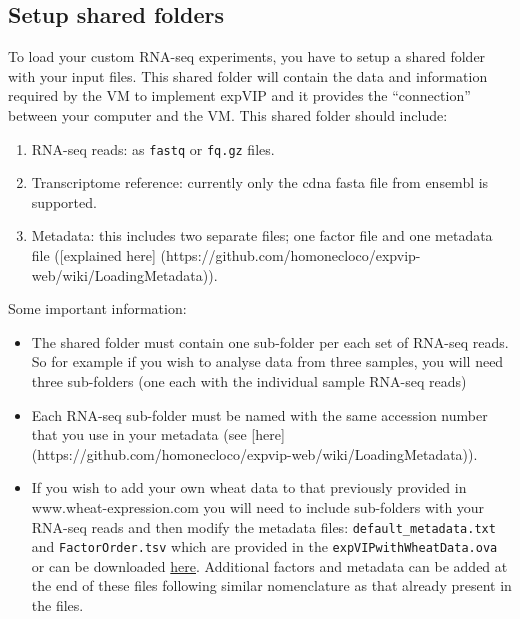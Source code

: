 \subsection{Setup shared folders}\label{setup-shared-folders}

To load your custom RNA-seq experiments, you have to setup a shared
folder with your input files. This shared folder will contain the data
and information required by the VM to implement expVIP and it provides
the ``connection'' between your computer and the VM. This shared folder
should include:

\begin{enumerate}
\def\labelenumi{\arabic{enumi}.}
\itemsep1pt\parskip0pt
\item
  RNA-seq reads: as \lstinline!fastq! or \lstinline!fq.gz! files.
\item
  Transcriptome reference: currently only the cdna fasta file from
  ensembl is supported.
\item
  Metadata: this includes two separate files; one factor file and one
  metadata file ({[}explained here{]}
  (https://github.com/homonecloco/expvip-web/wiki/LoadingMetadata)).
\end{enumerate}

Some important information:

\begin{itemize}
\itemsep1pt\parskip0pt
\item
  The shared folder must contain one sub-folder per each set of RNA-seq
  reads. So for example if you wish to analyse data from three samples,
  you will need three sub-folders (one each with the individual sample
  RNA-seq reads)
\item
  Each RNA-seq sub-folder must be named with the same accession number
  that you use in your metadata (see {[}here{]}
  (https://github.com/homonecloco/expvip-web/wiki/LoadingMetadata)).
\item
  If you wish to add your own wheat data to that previously provided in
  www.wheat-expression.com you will need to include sub-folders with
  your RNA-seq reads and then modify the metadata files:
  \lstinline!default_metadata.txt! and \lstinline!FactorOrder.tsv! which
  are provided in the \lstinline!expVIPwithWheatData.ova! or can be
  downloaded
  \href{https://www.dropbox.com/sh/n15tpsqj92wfn8u/AABivEEUj4sRd9tG830WnSi4a?dl=0}{here}.
  Additional factors and metadata can be added at the end of these files
  following similar nomenclature as that already present in the files.
\end{itemize}

